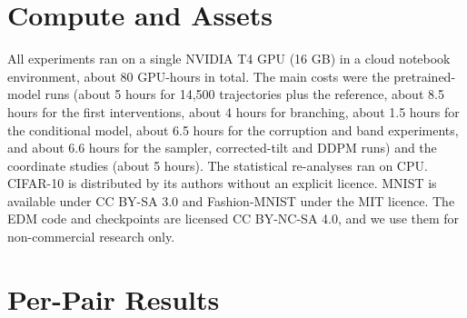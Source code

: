 \section{Compute and Assets}
\label{app:compute}

All experiments ran on a single NVIDIA T4 GPU (16 GB) in a cloud notebook environment, about 80 GPU-hours in total. The main costs were the pretrained-model runs (about 5 hours for 14{,}500 trajectories plus the reference, about 8.5 hours for the first interventions, about 4 hours for branching, about 1.5 hours for the conditional model, about 6.5 hours for the corruption and band experiments, and about 6.6 hours for the sampler, corrected-tilt and DDPM runs) and the coordinate studies (about 5 hours). The statistical re-analyses ran on CPU. CIFAR-10 \citep{krizhevsky2009learning} is distributed by its authors without an explicit licence. MNIST \citep{lecun1998gradient} is available under CC BY-SA 3.0 and Fashion-MNIST \citep{xiao2017fashion} under the MIT licence. The EDM code and checkpoints \citep{karras2022elucidating} are licensed CC BY-NC-SA 4.0, and we use them for non-commercial research only.

\clearpage
\section{Per-Pair Results}
\label{app:tables}

